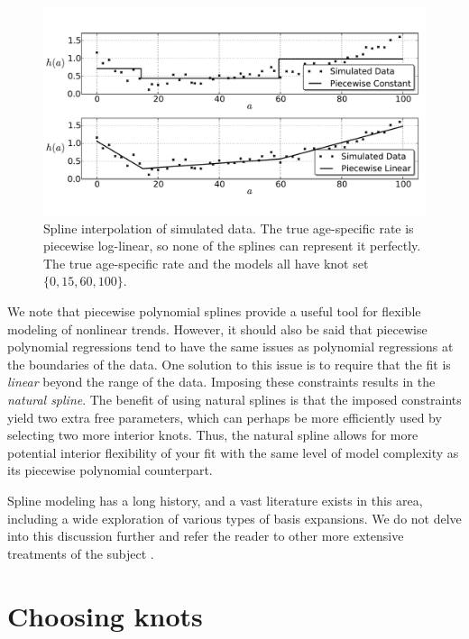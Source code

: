 \begin{figure}[h]
\begin{center}
\includegraphics[width=\textwidth]{splines-fig.pdf}
\caption{Spline interpolation of simulated data. The true age-specific
  rate is piecewise log-linear, so none of the splines can represent
  it perfectly. The true age-specific rate and the models all have
  knot set $\{0, 15, 60, 100\}$.}
\label{splines_fig}
\end{center}
\end{figure}

We note that piecewise polynomial splines provide a useful tool for
flexible modeling of nonlinear trends. However, it should also be
said that piecewise polynomial regressions tend to have the same
issues as polynomial regressions at the boundaries of the data. One
solution to this issue is to require that the fit is \emph{linear}
beyond the range of the data. Imposing these constraints results in
the \emph{natural spline}. The benefit of using natural splines is
that the imposed constraints yield two extra free parameters, which
can perhaps be more efficiently used by selecting two more interior
knots. Thus, the natural spline allows for more potential interior
flexibility of your fit with the same level of model complexity as its
piecewise polynomial counterpart.

Spline modeling has a long history, and a vast literature exists in
this area, including a wide exploration of various types of basis
expansions. We do not delve into this discussion further and refer the
reader to other more extensive treatments of the subject
\cite{Wahba_Spline_1990,ESL}.

\section{Choosing knots}

